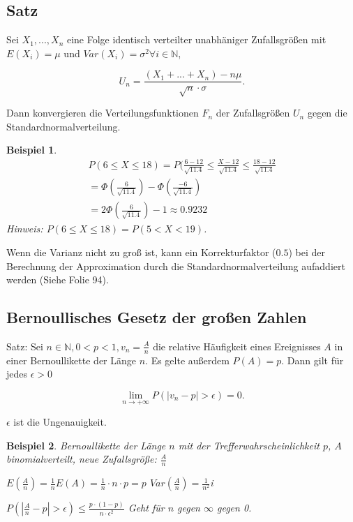 \documentclass{tufte-handout}
\theoremstyle{own}
\newtheorem{example}{Beispiel}[]
\begin{document}
\subsection{Satz}

Sei $X_1,...,X_n$ eine Folge identisch verteilter unabhäniger Zufallsgrößen
mit $E(X_i) = \mu$ und $Var(X_i) = \sigma^2 \forall i \in \mathbb{N}$,

\begin{equation}
	U_n = \frac{(X_1 + ... + X_n) - n\mu}{\sqrt{n} \cdot \sigma}.
\end{equation}

Dann konvergieren die Verteilungsfunktionen $F_n$ der Zufallsgrößen $U_n$ gegen
die Standardnormalverteilung.

\begin{example}
	\begin{gather*}
		P(6 \le X \le 18) = P(\frac{6-12}{\sqrt{11.4}} \le \frac{X-12}{\sqrt{11.4}} 
		\le \frac{18-12}{\sqrt{11.4}}\\
		= \Phi (\frac{6}{\sqrt{11.4}}) - \Phi (\frac{-6}{\sqrt{11.4}}) \\
		= 2 \Phi (\frac{6}{\sqrt{11.4}}) - 1 \approx 0.9232
	\end{gather*}
	Hinweis: $P(6 \le X \le 18) = P(5 < X <19)$.
\end{example}

Wenn die Varianz nicht zu groß ist, kann ein Korrekturfaktor ($0.5$) bei der
Berechnung der Approximation durch die Standardnormalverteilung aufaddiert
werden (Siehe Folie 94).

\subsection{Bernoullisches Gesetz der großen Zahlen}

Satz: Sei $n \in \mathbb{N}, 0 < p < 1, v_n = \frac{A}{n}$ die relative 
Häufigkeit eines Ereignisses $A$ in einer Bernoullikette der Länge $n$. Es 
gelte außerdem $P(A) = p$. Dann gilt für jedes $\epsilon > 0$

\begin{equation}
	\lim_{n \rightarrow +\infty} P(|v_n - p| > \epsilon) = 0.
\end{equation}

$\epsilon$ ist die Ungenauigkeit.

\begin{example}
Bernoullikette der Länge $n$ mit der Trefferwahrscheinlichkeit $p$, $A$
binomialverteilt, neue Zufallsgröße: $\frac{A}{n}$

$E(\frac{A}{n}) = \frac{1}{n} E(A) = \frac{1}{n} \cdot n \cdot p = p$
$Var(\frac{A}{n}) = \frac{1}{n^2}$i

$P(|\frac{A}{n} - p| > \epsilon) \le \frac{p \cdot (1 - p)}{n \cdot \epsilon^2}$
Geht für $n$ gegen $\infty$ gegen 0.
\end{example}
\end{document}
